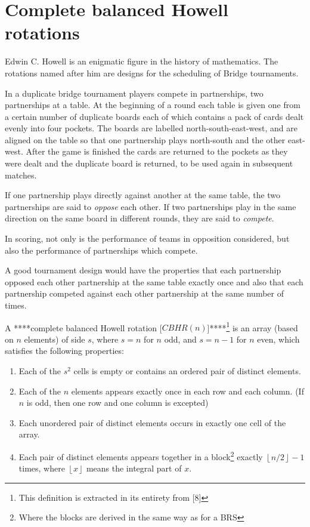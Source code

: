 \documentclass[
  12pt,
  a4paper]{book}
\begin{document}
\hypertarget{complete-balanced-howell-rotations}{%
\section{Complete balanced Howell rotations}\label{complete-balanced-howell-rotations}}

Edwin C. Howell is an enigmatic figure in the history of mathematics.
The rotations named after him are designs for the scheduling of Bridge
tournaments.

In a duplicate bridge tournament players compete in partnerships, two
partnerships at a table. At the beginning of a round each table is given
one from a certain number of duplicate boards each of which contains a
pack of cards dealt evenly into four pockets. The boards are labelled
north-south-east-west, and are aligned on the table so that one
partnership plays north-south and the other east-west. After the game is
finished the cards are returned to the pockets as they were dealt and
the duplicate board is returned, to be used again in subsequent
matches.

If one partnership plays directly against another at the same table, the
two partnerships are said to \emph{oppose} each other. If two partnerships
play in the same direction on the same board in different rounds, they
are said to \emph{compete}.

In scoring, not only is the performance of teams in opposition
considered, but also the performance of partnerships which compete.

A good tournament design would have the properties that each partnership
opposed each other partnership at the same table exactly once and also
that each partnership competed against each other partnership at the
same number of times.

A ****complete balanced Howell rotation {[}\(CBHR(n)\){]}****\footnote{This definition is extracted in its entirety from {[}8{]}} is an array
(based on \(n\) elements) of side \(s\), where \(s=n\) for \(n\) odd, and
\(s=n-1\) for \(n\) even, which satisfies the following properties:

\begin{enumerate}
\def\labelenumi{\arabic{enumi}.}
\item
  Each of the \(s^2\) cells is empty or contains an ordered pair of
  distinct elements.
\item
  Each of the \(n\) elements appears exactly once in each row and each
  column. (If \(n\) is odd, then one row and one column is excepted)
\item
  Each unordered pair of distinct elements occurs in exactly one cell
  of the array.
\item
  Each pair of distinct elements appears together in a block\footnote{Where the blocks are derived in the same way as for a BRS}
  exactly \(\left \lfloor{n/2}\right \rfloor -1\) times, where
  \(\left \lfloor{x}\right \rfloor\) means the integral part of \(x\).
\end{enumerate}
\end{document}
